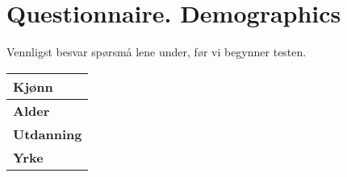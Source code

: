 \chapter{Questionnaire. Demographics}
\label{app:questionnaire}

Vennligst besvar sp\o rsm\r{a} lene under, f\o r vi begynner testen.
\begin{center}
	\begin{tabular}{ | p{10.0cm} |}
	\hline
	\textbf{Kj\o nn} \\[5ex] \hline
	\textbf{Alder} \\[5ex] \hline
	\textbf{Utdanning} \\[5ex] \hline
	\textbf{Yrke} \\[5ex] \hline
	\end{tabular}
\end{center}